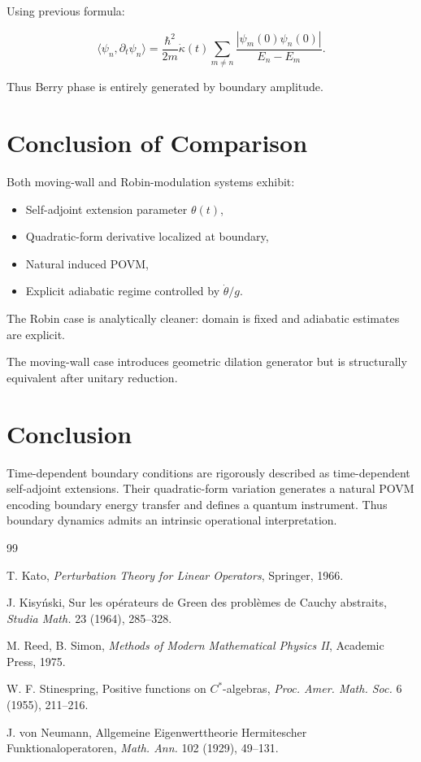 \documentclass[11pt,a4paper]{article}
\begin{document}
Using previous formula:

\[
\langle \psi_n,\partial_t\psi_n\rangle
=
\frac{\hbar^2}{2m}
\dot\kappa(t)
\sum_{m\neq n}
\frac{
|\psi_m(0)\psi_n(0)|
}{
E_n-E_m
}.
\]

Thus Berry phase is entirely generated by boundary amplitude.

\section{Conclusion of Comparison}

Both moving-wall and Robin-modulation systems exhibit:

\begin{itemize}
\item Self-adjoint extension parameter $\theta(t)$,
\item Quadratic-form derivative localized at boundary,
\item Natural induced POVM,
\item Explicit adiabatic regime controlled by $\dot\theta/g$.
\end{itemize}

The Robin case is analytically cleaner:
domain is fixed and adiabatic estimates are explicit.

The moving-wall case introduces geometric dilation generator
but is structurally equivalent after unitary reduction.

\section{Conclusion}

Time-dependent boundary conditions are rigorously described as
time-dependent self-adjoint extensions.
Their quadratic-form variation generates a natural POVM
encoding boundary energy transfer and defines a quantum instrument.
Thus boundary dynamics admits an intrinsic operational interpretation.

\begin{thebibliography}{99}

T. Kato,
\textit{Perturbation Theory for Linear Operators},
Springer, 1966.

J. Kisy\'nski,
Sur les op\'erateurs de Green des probl\`emes de Cauchy abstraits,
\textit{Studia Math.} 23 (1964), 285--328.

M. Reed, B. Simon,
\textit{Methods of Modern Mathematical Physics II},
Academic Press, 1975.

W. F. Stinespring,
Positive functions on $C^*$-algebras,
\textit{Proc. Amer. Math. Soc.} 6 (1955), 211--216.

J. von Neumann,
Allgemeine Eigenwerttheorie Hermitescher Funktionaloperatoren,
\textit{Math. Ann.} 102 (1929), 49--131.

\end{thebibliography}
\end{document}
